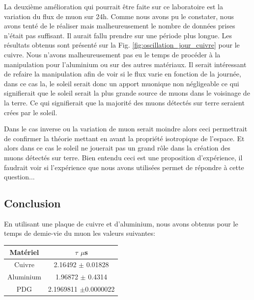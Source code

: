 \documentclass[12pt]{article}
\begin{document}
La deuxième amélioration qui pourrait être faite sur ce laboratoire est la variation du flux de muon sur 24h. Comme nous avons pu le constater, nous avons tenté de le réaliser mais malheureusement le nombre de données prises n'était pas suffisant. Il aurait fallu prendre sur une période plus longue. Les résultats obtenus sont présenté sur la Fig. \ref{fig:oscillation_jour_cuivre} pour le cuivre. Nous n'avons malheureusement pas eu le temps de procéder à la manipulation pour l'aluminium ou sur des autres matériaux. Il serait intéressant de refaire la manipulation afin de voir si le flux varie en fonction de la journée, dans ce cas la, le soleil serait donc un apport muonique non négligeable ce qui signifierait que le soleil serait la plus grande source de muons dans le voisinage de la terre. Ce qui signifierait que la majorité des muons détectés sur terre seraient crées par le soleil.

Dans le cas inverse ou la variation de muon serait moindre alors ceci permettrait de confirmer la théorie mettant en avant la propriété isotropique de l'espace. Et alors dans ce cas le soleil ne jouerait pas un grand rôle dans la création des muons détectés sur terre. Bien entendu ceci est une proposition d'expérience, il faudrait voir si l'expérience que nous avons utilisées permet de répondre à cette question...

\subsection{Conclusion}

En utilisant une plaque de cuivre et d'aluminium, nous avons obtenus pour le temps de demie-vie du muon les valeurs suivantes: 

\begin{center}
\begin{tabular}{||c|c||}
    \hline
    \textbf{Matériel}  & \textbf{$\tau$ $\mu$s}   \\
    \hline\hline
    Cuivre & 2.16492 $\pm$ 0.01828 \\
    \hline
    Aluminium & 1.96872 $\pm$ 0.4314\\
    \hline
    PDG &  2.1969811 $\pm $0.0000022 \\
    \hline
\end{tabular}
\end{center}
\end{document}

